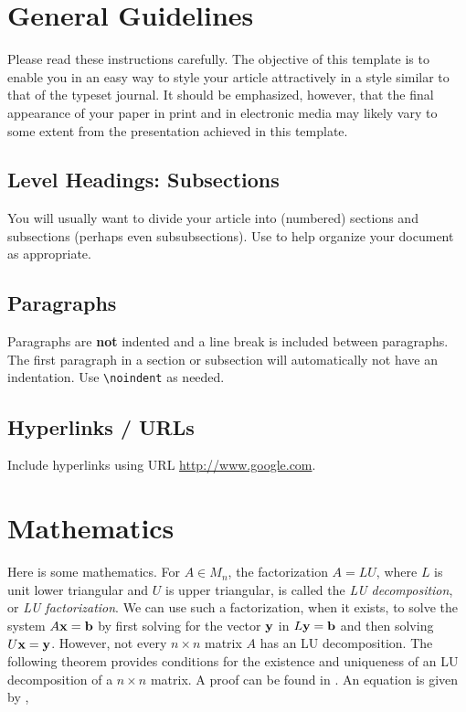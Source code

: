 \section{General Guidelines}

\noindent Please read these instructions carefully.   The objective of this template is to enable you in an easy way to style your article attractively in a style similar to that of the typeset journal. It should be emphasized, however, that the final appearance of your paper in print and in electronic media may likely vary to some extent from the presentation achieved in this template.


\subsection{Level Headings: Subsections}
\noindent You will usually want to divide your article into (numbered) sections and subsections (perhaps even subsubsections).  Use to help organize your document as appropriate.


\subsection{Paragraphs}
\noindent Paragraphs are \textbf{not} indented and a line break is included between paragraphs.  The first paragraph in a section or subsection will automatically  not  have an indentation.  Use \verb!\noindent! as needed.  


\subsection{Hyperlinks / URLs} 
Include hyperlinks using  URL \url{http://www.google.com}.  






 
\section{Mathematics}\label{sec:lu}
Here is some mathematics.  For $A \in M_n$, the factorization $A = LU$, where $L$ is unit lower triangular and $U$ is upper triangular,  is called the \textit{LU decomposition}, or \textit{LU factorization}.  We can use such a factorization, when it exists, to solve the system $A {\bf x} = {\bf b}$ by first solving for the vector $\bf{y}$ in $L {\bf y} = {\bf b}$ 
and then solving 
$
U {\bf x} = {\bf y}
$. 
However, not every $n \times n$ matrix $A$ has an LU decomposition.  The following theorem provides conditions for the existence and uniqueness of an LU decomposition of a $n \times n$ matrix.  A proof can be found in \citet[p. 160]{johnson1985matrix}.  An equation is given by \cite{strang1993introduction}, 

